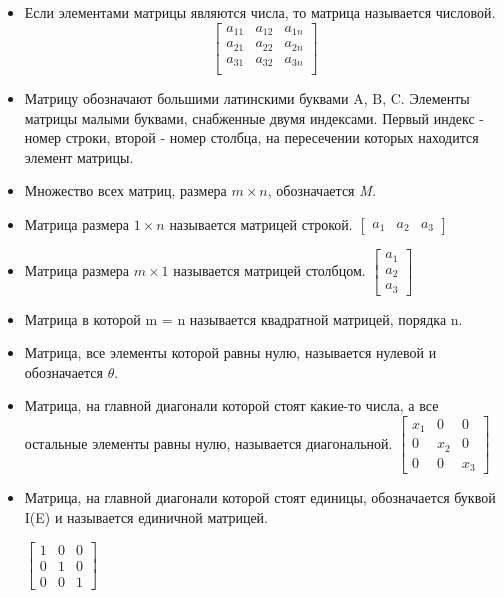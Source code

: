 \documentclass[12pt,a4paper]{report}
\begin{document}
\begin{itemize}

    \item Если элементами матрицы являются числа, то матрица называется числовой.
        $$
        \begin{bmatrix}
            a_{11} & a_{12} & a_{1n} \\
            a_{21} & a_{22} & a_{2n} \\
            a_{31} & a_{32} & a_{3n} \\
        \end{bmatrix}
        $$


    \item Матрицу обозначают большими латинскими буквами A, B, C. Элементы матрицы малыми буквами, снабженные двумя индексами. Первый индекс - номер строки, второй - номер столбца, на пересечении которых находится элемент матрицы.

    \item Множество всех матриц, размера $m \times n$, обозначается \it{M}.

    \item Матрица размера $1 \times n$ называется матрицей строкой.
        $
        \begin{bmatrix}
            a_1 & a_2 & a_3
        \end{bmatrix}
        $

    \item Матрица размера $m \times 1$ называется матрицей столбцом.
        $
        \begin{bmatrix}
            a_1 \\
            a_2 \\
            a_3
        \end{bmatrix}
        $

    \item Матрица в которой m = n называется квадратной матрицей, порядка n.

    \item Матрица, все элементы которой равны нулю, называется нулевой и обозначается $\theta$.

    \item Матрица, на главной диагонали которой стоят какие-то числа, а все остальные элементы равны нулю, называется диагональной.
        $
        \begin{bmatrix}
            x_1 & 0 & 0 \\
            0 & x_2 & 0 \\
            0 & 0 & x_3
        \end{bmatrix}
        $

    \item Матрица, на главной диагонали которой стоят единицы, обозначается буквой I(E) и называется единичной матрицей.

        $
        \begin{bmatrix}
            1 & 0 & 0 \\
            0 & 1 & 0 \\
            0 & 0 & 1
        \end{bmatrix}
        $

\end{itemize}
\end{document}
